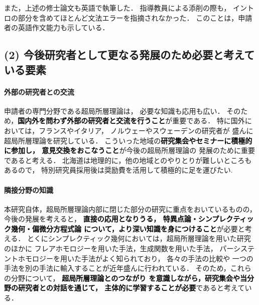 \documentclass[11pt,a4paper,uplatex,dvipdfmx]{ujarticle} 		%
\newcommand{\研究課題名}{打切り超局所台を用いた層のフーリエ変換の研究とシンプレクティック幾何への応用}
\newcommand{\研究機関名}{北海道大学}
\newcommand{\研究代表者氏名}{大柴寿浩}
\begin{document}
また，上述の修士論文も英語で執筆した．
指導教員による添削の際も，
イントロの部分を含めてほとんど文法エラーを指摘されなかった．
このことは，申請者の英語作文能力も示している．





\subsection*{(2) 今後研究者として更なる発展のため必要と考えている要素}
\paragraph*{外部の研究者との交流}
申請者の専門分野である超局所層理論は，
必要な知識も応用も広い．
そのため，\textcolor{black}{\textbf{国内外を問わず外部の研究者と交流を行うこと}}が重要である．
特に国外においては，フランスやイタリア，
ノルウェーやスウェーデンの研究者が
盛んに超局所層理論を研究している．
こういった地域の\textcolor{black}{\textbf{研究集会やセミナーに積極的に参加し，
意見交換をおこなうこと}}が今後の超局所層理論の
発展のために重要であると考える．
北海道は地理的に，他の地域とのやりとりが難しいところもあるので，
特別研究員採用後は奨励費を活用して積極的に足を運びたい.
\paragraph*{隣接分野の知識}
本研究自体，超局所層理論内部に閉じた部分の研究に重点をおいているものの，
今後の発展を考えると，
\textcolor{black}{\textbf{直接の応用となりうる，
特異点論・シンプレクティック幾何・偏微分方程式論
について，より深い知識を身につけること}}が必要と考える．
とくにシンプレクティック幾何においては，超局所層理論を用いた研究のほかに
フレアホモロジーを用いた手法，生成関数を用いた手法，
パーシステントホモロジーを用いた手法がよく知られており，
各々の手法の比較や
一つの手法を別の手法に輸入することが近年盛んに行われている．
そのため，これらの分野について，
\textcolor{black}{\textbf{超局所層理論とのつながり
を意識しながら，研究集会や当分野の研究者との対話を通じて，
主体的に学習することが必要}}であると考えている．



\end{document}
